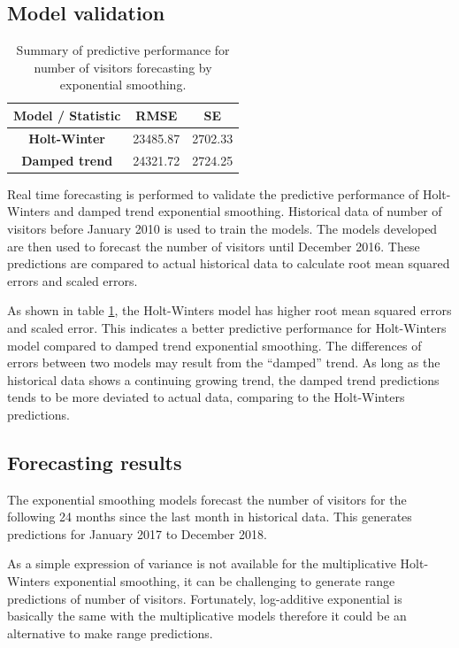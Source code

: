 \documentclass[letterpaper,12pt,twoside,]{pinp}
\begin{document}
\hypertarget{model-validation}{%
\subsection{Model validation}\label{model-validation}}

\begin{table}
\begin{tabular}{ |c|c|c| } 
\hline
\textbf{Model / Statistic} & \textbf{RMSE} & \textbf{SE} \\
\hline
\textbf{Holt-Winter} & 23485.87 & 2702.33 \\ 
\textbf{Damped trend} & 24321.72 & 2724.25 \\
\hline
\end{tabular}
\centering
\caption{Summary of predictive performance for number of visitors forecasting by exponential smoothing.}
\label{table:cv_es}
\end{table}

Real time forecasting is performed to validate the predictive
performance of Holt-Winters and damped trend exponential smoothing.
Historical data of number of visitors before January 2010 is used to
train the models. The models developed are then used to forecast the
number of visitors until December 2016. These predictions are compared
to actual historical data to calculate root mean squared errors and
scaled errors.

As shown in table \ref{table:cv_es}, the Holt-Winters model has higher
root mean squared errors and scaled error. This indicates a better
predictive performance for Holt-Winters model compared to damped trend
exponential smoothing. The differences of errors between two models may
result from the ``damped'' trend. As long as the historical data shows a
continuing growing trend, the damped trend predictions tends to be more
deviated to actual data, comparing to the Holt-Winters predictions.

\hypertarget{forecasting-results}{%
\subsection{Forecasting results}\label{forecasting-results}}

The exponential smoothing models forecast the number of visitors for the
following 24 months since the last month in historical data. This
generates predictions for January 2017 to December 2018.

As a simple expression of variance is not available for the
multiplicative Holt-Winters exponential smoothing, it can be challenging
to generate range predictions of number of visitors. Fortunately,
log-additive exponential is basically the same with the multiplicative
models therefore it could be an alternative to make range predictions.
\end{document}
